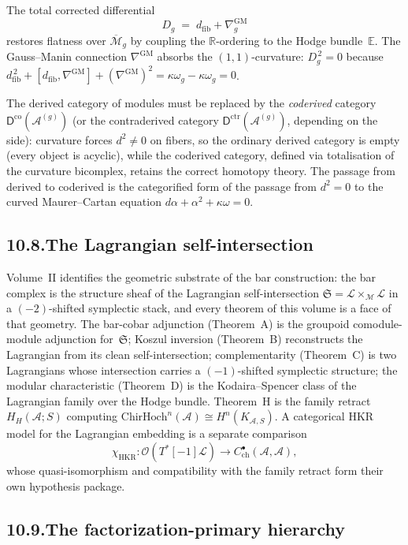 \documentclass[11pt]{report}
\theoremstyle{definition}
\theoremstyle{remark}
\providecommand{\cA}{\mathcal{A}}
\providecommand{\cM}{\mathcal{M}}
\providecommand{\cO}{\mathcal{O}}
\providecommand{\ChirHoch}{\mathrm{ChirHoch}}
\numberwithin{equation}{section}
\begin{document}
The total corrected differential
\[
D_g\;=\;d_{\mathrm{fib}}+\nabla^{\mathrm{GM}}_g
\]
restores flatness over $\overline{\cM}_g$ by coupling the
$\mathbb R$-ordering to the Hodge bundle~$\mathbb E$. The
Gauss--Manin connection $\nabla^{\mathrm{GM}}$ absorbs the
$(1,1)$-curvature: $D_g^{\,2}=0$ because
$d_{\mathrm{fib}}^{\,2}+[d_{\mathrm{fib}},\nabla^{\mathrm{GM}}]
+(\nabla^{\mathrm{GM}})^2=\kappa\omega_g-\kappa\omega_g=0$.

The derived category of modules must be replaced by the
\emph{coderived} category $\mathsf{D}^{\mathrm{co}}(\cA^{(g)})$
(or the contraderived category
$\mathsf{D}^{\mathrm{ctr}}(\cA^{(g)})$, depending on the side):
curvature forces $d^2\neq 0$ on fibers, so the ordinary derived
category is empty (every object is acyclic), while the coderived
category, defined via totalisation of the curvature bicomplex,
retains the correct homotopy theory. The passage from derived
to coderived is the categorified form of the passage from
$d^2=0$ to the curved Maurer--Cartan equation
$d\alpha+\alpha^2+\kappa\omega=0$.

\subsection*{10.8.\enspace The Lagrangian self-intersection}

Volume~II identifies the geometric substrate of the bar construction:
the bar complex is the structure sheaf of the Lagrangian
self-intersection
$\mathfrak{S} = \mathcal{L} \times_{\mathcal{M}} \mathcal{L}$
in a $(-2)$-shifted symplectic stack, and every theorem of this
volume is a face of that geometry.
The bar-cobar adjunction (Theorem~A) is the groupoid
comodule-module adjunction for~$\mathfrak{S}$;
Koszul inversion (Theorem~B) reconstructs the Lagrangian from
its clean self-intersection;
complementarity (Theorem~C) is two Lagrangians whose intersection
carries a $(-1)$-shifted symplectic structure;
the modular characteristic (Theorem~D) is the Kodaira--Spencer
class of the Lagrangian family over the Hodge bundle.  Theorem~H is
the family retract $H_H(\cA;S)$ computing
$\ChirHoch^n(\cA)\cong H^n(K_{\cA,S})$.  A categorical HKR model for
the Lagrangian embedding is a separate comparison
\[
 \chi_{\mathrm{HKR}}\colon
 \cO(T^*[-1]\mathcal L)\longrightarrow
 C^\bullet_{\mathrm{ch}}(\cA,\cA),
\]
whose quasi-isomorphism and compatibility with the family retract
form their own hypothesis package.

\subsection*{10.9.\enspace The factorization-primary hierarchy}
\end{document}
